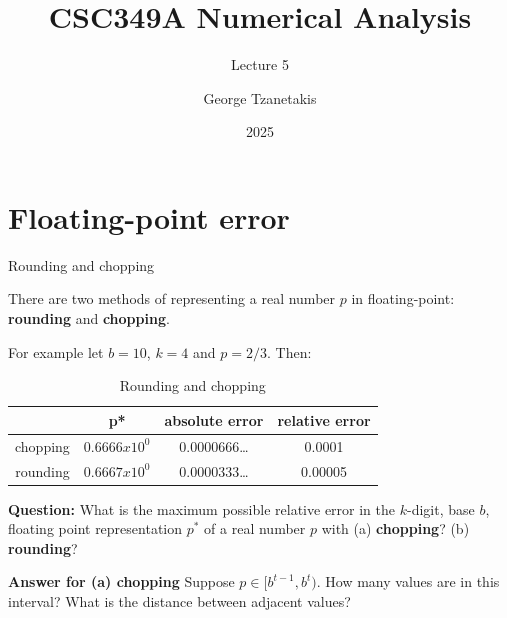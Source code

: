 \documentclass[12pt]{beamer}
\title[CSC349A Numerical Analysis]{CSC349A Numerical Analysis}
\subtitle[Leture 5]{Lecture 5}
\date[2025]{2025}
\author[George Tzanetakis]{George Tzanetakis}
\institute[University of Victoria]{University of Victoria}
\begin{document}
\frame{\maketitle} %



\section{Floating-point error}
\begin{frame}{Rounding and chopping}

There are two methods of representing a real number $p$ in floating-point: {\bf rounding} and {\bf chopping}. 

For example let $b = 10$, $k=4$ and $p = 2/3$. Then: 


\begin{table}[h]
\begin{tabular}{|c|c|c|c|} 
\hline
         & p*            & absolute error & relative error \\
\hline
chopping & $0.6666x10^0$ & 0.0000666\dots & 0.0001 \\ 
\hline
rounding & $0.6667x10^0$ & 0.0000333\dots & 0.00005 \\  
\hline 
\end{tabular} 
\caption{Rounding and chopping} 
\end{table} 

\end{frame}

\begin{frame}
{\bf Question:} What is the maximum possible relative error in the $k$-digit, base $b$, floating point representation $p^*$ of a real number $p$  with (a) {\bf chopping}? (b) {\bf rounding}?


\end{frame} 

\begin{frame}
{\bf Answer for (a) chopping} Suppose $p \in [b^{t-1},b^t)$. How many values are in this interval? What is the distance between adjacent values?
\vspace{3 in}


\end{frame} 
\end{document}
